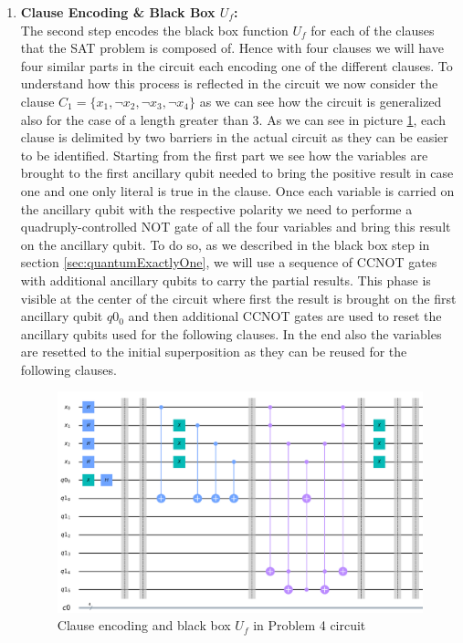 \documentclass[english]{article}
\begin{document}
\begin{enumerate}
					\item \textbf{Clause Encoding \& Black Box $U_f$:}\\
						The second step encodes the black box function $U_f$ for each of the clauses that the SAT problem is composed of. Hence with four clauses we will have four similar parts in the circuit each encoding one of the different clauses. To understand how this process is reflected in the circuit we now consider the clause $C_1 = \{x_1, \neg x_2, \neg x_3, \neg x_4\}$ as we can see how the circuit is generalized also for the case of a length greater than 3. As we can see in picture \ref{fig:clauseEncodingCircuit}, each clause is delimited by two barriers in the actual circuit as they can be easier to be identified. Starting from the first part we see how the variables are brought to the first ancillary qubit needed to bring the positive result in case one and one only literal is true in the clause. Once each variable is carried on the ancillary qubit with the respective polarity we need to performe a quadruply-controlled NOT gate of all the four variables and bring this result on the ancillary qubit. To do so, as we described in the black box step in section \ref{sec:quantumExactlyOne}, we will use a sequence of CCNOT gates with additional ancillary qubits to carry the partial results. This phase is visible at the center of the circuit where first the result is brought on the first ancillary qubit $q0_0$ and then additional CCNOT gates are used to reset the ancillary qubits used for the following clauses. In the end also the variables are resetted to the initial superposition as they can be reused for the following clauses.
						\begin{figure}[h]
							\centering
							\includegraphics[scale=0.55]{Clause_Encoding_Circuit.png}
							\caption{
								\label{fig:clauseEncodingCircuit}
								Clause encoding and black box $U_f$ in Problem 4 circuit
							}
						\end{figure}
					

\end{enumerate}
\end{document}
